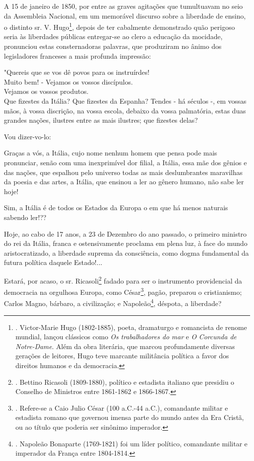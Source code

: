 A 15 de janeiro de 1850, por entre as graves agitações que tumultuavam
no seio da Assembleia Nacional, em um memorável discurso sobre a
liberdade de ensino, o distinto sr. V. Hugo\footnote{. Victor-Marie Hugo
  (1802-1885), poeta, dramaturgo e romancista de renome mundial, lançou
  clássicos como \emph{Os trabalhadores do mar} e \emph{O Corcunda de
  Notre-Dame}. Além da obra literária, que marcou profundamente diversas
  gerações de leitores, Hugo teve marcante militância política a favor
  dos direitos humanos e da democracia.}, depois de ter cabalmente
demonstrado quão perigoso seria às liberdades públicas entregar-se ao
clero a educação da mocidade, pronunciou estas consternadoras palavras,
que produziram no ânimo dos legisladores franceses a mais profunda
impressão:

"Quereis que se vos dê povos para os instruírdes!\\
Muito bem! - Vejamos os vossos discípulos.\\
Vejamos os vossos produtos.\\
Que fizestes da Itália? Que fizestes da Espanha? Tendes - há séculos -,
em vossas mãos, à vossa discrição, na vossa escola, debaixo da vossa
palmatória, estas duas grandes nações, ilustres entre as mais ilustres;
que fizestes delas?

Vou dizer-vo-lo:

Graças a vós, a Itália, cujo nome nenhum homem que pensa pode mais
pronunciar, senão com uma inexprimível dor filial, a Itália, essa mãe
dos gênios e das nações, que espalhou pelo universo todas as mais
deslumbrantes maravilhas da poesia e das artes, a Itália, que ensinou a
ler ao gênero humano, não sabe ler hoje!

Sim, a Itália é de todos os Estados da Europa o em que há menos naturais
sabendo ler!??

Hoje, ao cabo de 17 anos, a 23 de Dezembro do ano passado, o primeiro
ministro do rei da Itália, franca e ostensivamente proclama em plena
luz, à face do mundo aristocratizado, a liberdade suprema da
consciência, como dogma fundamental da futura política daquele
Estado!...

Estará, por acaso, o sr. Ricasoli\footnote{. Bettino Ricasoli
  (1809-1880), político e estadista italiano que presidiu o Conselho de
  Ministros entre 1861-1862 e 1866-1867.} fadado para ser o instrumento
providencial da democracia na orgulhosa Europa, como César\footnote{.
  Refere-se a Caio Julio César (100 a.C.-44 a.C.), comandante militar e
  estadista romano que governou imensa parte do mundo antes da Era
  Cristã, ou ao título que poderia ser sinônimo imperador.}, pagão,
preparou o cristianismo; Carlos Magno, bárbaro, a civilização; e
Napoleão\footnote{. Napoleão Bonaparte (1769-1821) foi um líder
  político, comandante militar e imperador da França entre 1804-1814.},
déspota, a liberdade?

